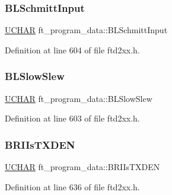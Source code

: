 \subsubsection{\texorpdfstring{B\+L\+Schmitt\+Input}{BLSchmittInput}}
{\footnotesize\ttfamily \hyperlink{CatCaloProto40MHz_2inc_2WinTypes_8h_a4f4bb67531a9bf6f0b9c6ad76aeba587}{U\+C\+H\+AR} ft\+\_\+program\+\_\+data\+::\+B\+L\+Schmitt\+Input}



Definition at line 604 of file ftd2xx.\+h.

\mbox{\label{structft__program__data_a2ad27a0b136d52c82e97be0596d24f7d}} 
\subsubsection{\texorpdfstring{B\+L\+Slow\+Slew}{BLSlowSlew}}
{\footnotesize\ttfamily \hyperlink{CatCaloProto40MHz_2inc_2WinTypes_8h_a4f4bb67531a9bf6f0b9c6ad76aeba587}{U\+C\+H\+AR} ft\+\_\+program\+\_\+data\+::\+B\+L\+Slow\+Slew}



Definition at line 603 of file ftd2xx.\+h.

\mbox{\label{structft__program__data_af35654fab6e4041be1cea5daa8771f07}} 
\subsubsection{\texorpdfstring{B\+R\+I\+Is\+T\+X\+D\+EN}{BRIIsTXDEN}}
{\footnotesize\ttfamily \hyperlink{CatCaloProto40MHz_2inc_2WinTypes_8h_a4f4bb67531a9bf6f0b9c6ad76aeba587}{U\+C\+H\+AR} ft\+\_\+program\+\_\+data\+::\+B\+R\+I\+Is\+T\+X\+D\+EN}



Definition at line 636 of file ftd2xx.\+h.

\mbox{\label{structft__program__data_ae66209d112e6834f94f496de77020605}} 
